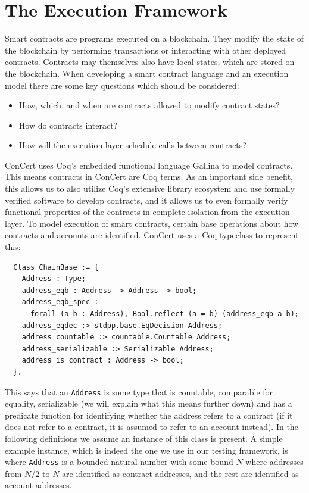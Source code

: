 \documentclass[twoside,11pt,openright]{report}
\newenvironment{code}{\captionsetup{type=figure, singlelinecheck=off, justification=raggedleft}}{}
\newcommand{\cc}{ConCert}
\newcommand{\coq}[1]{\texttt{#1}}
\begin{document}
\section{The Execution Framework}
\label{sec:execution-framework}
Smart contracts are programs executed on a blockchain. They modify the state of the blockchain by performing transactions or interacting with other deployed contracts. Contracts may themselves also have local states, which are stored on the blockchain. When developing a smart contract language and an execution model there are some key questions which should be considered:
\begin{itemize}
    \item How, which, and when are contracts allowed to modify contract states?
    \item How do contracts interact?
    \item How will the execution layer schedule calls between contracts?
\end{itemize}
\cc{} uses Coq's embedded functional language Gallina to model contracts. This means contracts in \cc{} are Coq terms. As an important side benefit, this allows us to also utilize Coq's extensive library ecosystem and use formally verified software to develop contracts, and it allows us to even formally verify functional properties of the contracts in complete isolation from the execution layer.
To model execution of smart contracts, certain base operations about how contracts and accounts are identified. \cc{} uses a Coq typeclass to represent this:
\begin{code}
\label{def:chainbase}
\begin{verbatim}
  Class ChainBase := {
    Address : Type;
    address_eqb : Address -> Address -> bool;
    address_eqb_spec :
      forall (a b : Address), Bool.reflect (a = b) (address_eqb a b);
    address_eqdec :> stdpp.base.EqDecision Address;
    address_countable :> countable.Countable Address;
    address_serializable :> Serializable Address;
    address_is_contract : Address -> bool;
  }.
\end{verbatim}
\end{code}
This says that an \coq{Address} is some type that is countable, comparable for equality, serializable (we will explain what this means further down) and has a predicate function for identifying whether the address refers to a contract (if it does not refer to a contract, it is assumed to refer to an account instead). In the following definitions we assume an instance of this class is present. A simple example instance, which is indeed the one we use in our testing framework, is where \coq{Address} is a bounded natural number with some bound $N$ where addresses from $N/2$ to $N$ are identified as contract addresses, and the rest are identified as account addresses.
\end{document}
